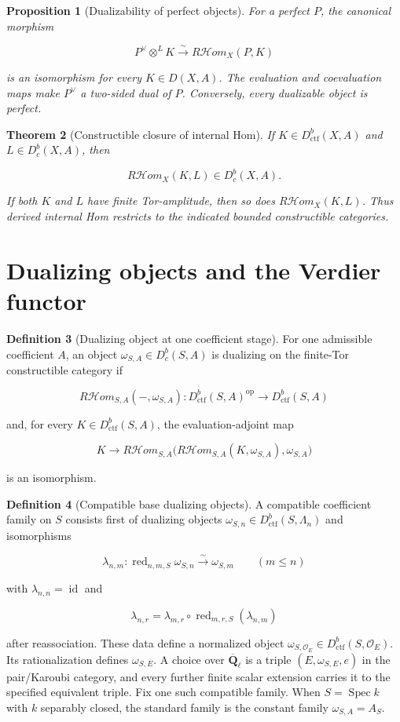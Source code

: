 \documentclass[10pt]{article}
\newtheorem{theorem}{Theorem}[section]
\newtheorem{proposition}[theorem]{Proposition}
\theoremstyle{definition}
\newtheorem{definition}[theorem]{Definition}
\newcommand{\Qlb}{\overline{\mathbf Q}_\ell}
\newcommand{\OO}{\mathcal O}
\newcommand{\Dbc}{D^b_c}
\newcommand{\Dctf}{D^b_{\mathrm{ctf}}}
\newcommand{\RHom}{R\mathcal Hom}
\newcommand{\red}{\operatorname{red}}
\begin{document}
\begin{proposition}[Dualizability of perfect objects]
For a perfect \(P\), the canonical morphism

\[
 P^\vee\otimes^L K\xrightarrow{\sim}\RHom_X(P,K)
\]

is an isomorphism for every \(K\in D(X,A)\).  The evaluation and coevaluation
maps make \(P^\vee\) a two-sided dual of \(P\).  Conversely, every dualizable
object is perfect.
\end{proposition}

\begin{theorem}[Constructible closure of internal Hom]
If \(K\in\Dctf(X,A)\) and \(L\in\Dbc(X,A)\), then

\[
 \RHom_X(K,L)\in\Dbc(X,A).
\]

If both \(K\) and \(L\) have finite Tor-amplitude, then so does
\(\RHom_X(K,L)\).  Thus derived internal Hom restricts to the indicated
bounded constructible categories.
\end{theorem}

\section{Dualizing objects and the Verdier functor}

\begin{definition}[Dualizing object at one coefficient stage]
For one admissible coefficient \(A\), an object
\(\omega_{S,A}\in\Dbc(S,A)\) is dualizing on the finite-Tor constructible
category if

\[
 \RHom_{S,A}(-,\omega_{S,A}):
 \Dctf(S,A)^{\mathrm{op}}\longrightarrow\Dctf(S,A)
\]

and, for every \(K\in\Dctf(S,A)\), the evaluation-adjoint map

\[
 K\longrightarrow
 \RHom_{S,A}\bigl(\RHom_{S,A}(K,\omega_{S,A}),\omega_{S,A}\bigr)
\]

is an isomorphism.
\end{definition}

\begin{definition}[Compatible base dualizing objects]
A compatible coefficient family on \(S\) consists first of dualizing objects
\(\omega_{S,n}\in\Dctf(S,\Lambda_n)\) and isomorphisms

\[
 \lambda_{n,m}:\red_{n,m,S}\omega_{S,n}
 \xrightarrow{\sim}\omega_{S,m}\qquad(m\leq n)
\]

with \(\lambda_{n,n}=\operatorname{id}\) and

\[
 \lambda_{n,r}=\lambda_{m,r}\circ
 \red_{m,r,S}(\lambda_{n,m})
\]

after reassociation.  These data define a normalized object
\(\omega_{S,\OO_E}\in\Dctf(S,\OO_E)\).  Its rationalization defines
\(\omega_{S,E}\).  A choice over \(\Qlb\) is a triple
\((E,\omega_{S,E},e)\) in the pair/Karoubi category, and every further
finite scalar extension carries it to the specified equivalent triple.
Fix one such compatible family.  When \(S=\operatorname{Spec}k\) with
\(k\) separably closed, the standard family is the constant family
\(\omega_{S,A}=A_S\).
\end{definition}
\end{document}
